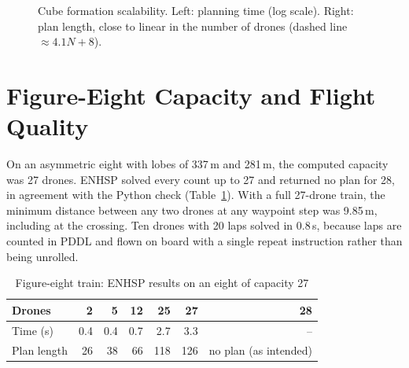 \documentclass[11pt,a4paper,oneside]{report}
\begin{document}
\begin{figure}[H]
\centering
{}\hfill
{}
\caption{Cube formation scalability. Left: planning time (log scale). Right: plan length, close to
linear in the number of drones (dashed line $\approx 4.1N + 8$).}
\label{fig:cubeplot}
\end{figure}

\section{Figure-Eight Capacity and Flight Quality}
On an asymmetric eight with lobes of 337\,m and 281\,m, the computed capacity was 27 drones. ENHSP
solved every count up to 27 and returned no plan for 28, in agreement with the Python check
(Table~\ref{tab:fig8}). With a full 27-drone train, the minimum distance between any two drones at
any waypoint step was 9.85\,m, including at the crossing. Ten drones with 20 laps solved in 0.8\,s,
because laps are counted in PDDL and flown on board with a single repeat instruction rather than
being unrolled.

\begin{table}[H]
\caption{Figure-eight train: ENHSP results on an eight of capacity 27}\label{tab:fig8}
\small
\begin{tabular*}{\textwidth}{@{\extracolsep{\fill}}lrrrrrr@{}}
\toprule
\textbf{Drones} & 2 & 5 & 12 & 25 & 27 & 28 \\
\midrule
Time (s) & 0.4 & 0.4 & 0.7 & 2.7 & 3.3 & -- \\
Plan length & 26 & 38 & 66 & 118 & 126 & no plan (as intended) \\
\bottomrule
\end{tabular*}
\end{table}
\end{document}
